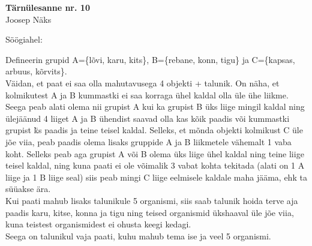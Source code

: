 \documentclass {article}
\begin{document}
\begin{center}
\Large\textbf{T\"arn\"ulesanne nr. 10}\\
\small{Joosep N\"aks}
\end{center}
S\"o\"ogiahel:
\begin {center}
\end{center}
Defineerin grupid A=\{l\~ovi, karu, kits\}, B=\{rebane, konn, tigu\} ja C=\{kapsas, arbuus, k\~orvits\}.\\
V\"aidan, et paat ei saa olla mahutavusega 4 objekti + talunik. On n\"aha, et kolmikutest A ja B kummastki ei saa korraga \"uhel kaldal olla \"ule \"uhe liikme. Seega peab alati olema nii grupist A kui ka grupist B \"uks liige mingil kaldal ning \"ulej\"a\"anud 4 liiget A ja B \"uhendist saavad olla kas k\~oik paadis v\~oi kummastki grupist \"ks paadis ja teine teisel kaldal. Selleks, et m\~onda objekti kolmikust C \"ule j\~oe viia, peab paadis olema lisaks gruppide A ja B liikmetele v\"ahemalt 1 vaba koht. Selleks peab aga grupist A v\~oi B olema \"uks liige \"uhel kaldal ning teine liige teisel kaldal, ning kuna paati ei ole v\~oimalik 3 vabat kohta tekitada (alati on 1 A liige ja 1 B liige seal) siis peab mingi C liige eelmisele kaldale maha j\"a\"ama, ehk ta s\"u\"uakse \"ara.\\
Kui paati mahub lisaks talunikule 5 organismi, siis saab talunik hoida terve aja paadis karu, kitse, konna ja tigu ning teised organismid \"ukshaaval \"ule j\~oe viia, kuna teistest organismidest ei ohusta keegi kedagi.\\
Seega on talunikul vaja paati, kuhu mahub tema ise ja veel 5 organismi.
\end{document}
